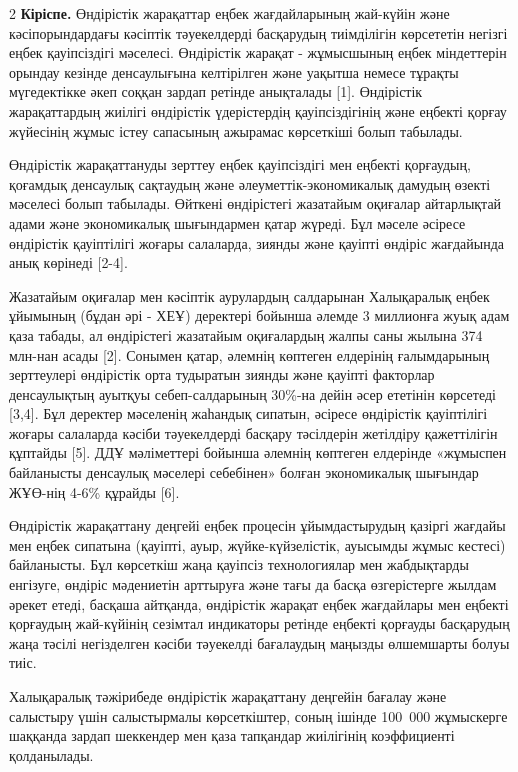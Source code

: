 \begin{multicols}{2}
{\bfseries Кіріспе.} Өндірістік жарақаттар еңбек жағдайларының жай-күйін
және кәсіпорындардағы кәсіптік тәуекелдерді басқарудың тиімділігін
көрсететін негізгі еңбек қауіпсіздігі мәселесі. Өндірістік жарақат -
жұмысшының еңбек міндеттерін орындау кезінде денсаулығына келтірілген
және уақытша немесе тұрақты мүгедектікке әкеп соққан зардап ретінде
анықталады {[}1{]}. Өндірістік жарақаттардың жиілігі өндірістік
үдерістердің қауіпсіздігінің және еңбекті қорғау жүйесінің жұмыс істеу
сапасының ажырамас көрсеткіші болып табылады.

Өндірістік жарақаттануды зерттеу еңбек қауіпсіздігі мен еңбекті
қорғаудың, қоғамдық денсаулық сақтаудың және әлеуметтік-экономикалық
дамудың өзекті мәселесі болып табылады. Өйткені өндірістегі жазатайым
оқиғалар айтарлықтай адами және экономикалық шығындармен қатар жүреді.
Бұл мәселе әсіресе өндірістік қауіптілігі жоғары салаларда, зиянды және
қауіпті өндіріс жағдайында анық көрінеді {[}2-4{]}.

Жазатайым оқиғалар мен кәсіптік аурулардың салдарынан Халықаралық еңбек
ұйымының (бұдан әрі - ХЕҰ) деректері бойынша әлемде 3 миллионға жуық
адам қаза табады, ал өндірістегі жазатайым оқиғалардың жалпы саны жылына
374 млн-нан асады {[}2{]}. Сонымен қатар, әлемнің көптеген елдерінің
ғалымдарының зерттеулері өндірістік орта тудыратын зиянды және қауіпті
факторлар денсаулықтың ауытқуы себеп-салдарының 30\%-на дейін әсер
ететінін көрсетеді {[}3,4{]}. Бұл деректер мәселенің жаһандық сипатын,
әсіресе өндірістік қауіптілігі жоғары салаларда кәсіби тәуекелдерді
басқару тәсілдерін жетілдіру қажеттілігін құптайды {[}5{]}. ДДҰ
мәліметтері бойынша әлемнің көптеген елдерінде «жұмыспен байланысты
денсаулық мәселері себебінен» болған экономикалық шығындар ЖҰӨ-нің 4-6\%
құрайды {[}6{]}.

Өндірістік жарақаттану деңгейі еңбек процесін ұйымдастырудың қазіргі
жағдайы мен еңбек сипатына (қауіпті, ауыр, жүйке-күйзелістік, ауысымды
жұмыс кестесі) байланысты. Бұл көрсеткіш жаңа қауіпсіз технологиялар мен
жабдықтарды енгізуге, өндіріс мәдениетін арттыруға және тағы да басқа
өзгерістерге жылдам әрекет етеді, басқаша айтқанда, өндірістік жарақат
еңбек жағдайлары мен еңбекті қорғаудың жай-күйінің сезімтал индикаторы
ретінде еңбекті қорғауды басқарудың жаңа тәсілі негізделген кәсіби
тәуекелді бағалаудың маңызды өлшемшарты болуы тиіс.

Халықаралық тәжірибеде өндірістік жарақаттану деңгейін бағалау және
салыстыру үшін салыстырмалы көрсеткіштер, соның ішінде 100~000
жұмыскерге шаққанда зардап шеккендер мен қаза тапқандар жиілігінің
коэффициенті қолданылады.


\end{multicols}
